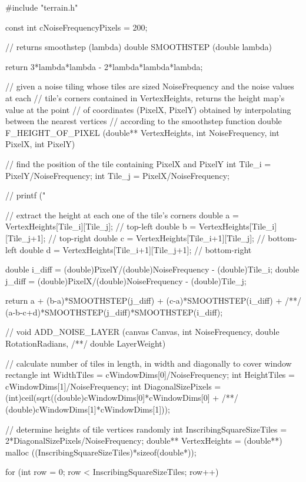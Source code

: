 \begin{C}
#include "terrain.h"


const int cNoiseFrequencyPixels = 200;


// returns smoothstep (lambda)
double SMOOTHSTEP (double lambda){
	
	return 3*lambda*lambda - 2*lambda*lambda*lambda;
}


// given a noise tiling whose tiles are sized NoiseFrequency and the noise values at each
// tile's corners contained in VertexHeights, returns the height map's value at the point
// of coordinates (PixelX, PixelY) obtained by interpolating between the nearest vertices
// according to the smoothstep function
double F_HEIGHT_OF_PIXEL (double** VertexHeights, int NoiseFrequency, int PixelX, int PixelY){
	
	// find the position of the tile containing PixelX and PixelY
	int Tile_i = PixelY/NoiseFrequency;
	int Tile_j = PixelX/NoiseFrequency;
	
	// printf ("%
	
	// extract the height at each one of the tile's corners
	double a = VertexHeights[Tile_i][Tile_j];     // top-left
	double b = VertexHeights[Tile_i][Tile_j+1];   // top-right
	double c = VertexHeights[Tile_i+1][Tile_j];   // bottom-left
	double d = VertexHeights[Tile_i+1][Tile_j+1]; // bottom-right
	
	double i_diff = (double)PixelY/(double)NoiseFrequency - (double)Tile_i;
	double j_diff = (double)PixelX/(double)NoiseFrequency - (double)Tile_j;
	
	return a + (b-a)*SMOOTHSTEP(j_diff) + (c-a)*SMOOTHSTEP(i_diff) +
	/**/ (a-b-c+d)*SMOOTHSTEP(j_diff)*SMOOTHSTEP(i_diff);
}


// 
void ADD_NOISE_LAYER (canvas Canvas, int NoiseFrequency, double RotationRadians,
/**/ double LayerWeight){
	
	// calculate number of tiles in length, in width and diagonally to cover window rectangle
	int WidthTiles = cWindowDims[0]/NoiseFrequency;
	int HeightTiles = cWindowDims[1]/NoiseFrequency;
	int DiagonalSizePixels = (int)ceil(sqrt((double)cWindowDims[0]*cWindowDims[0] +
	/**/ (double)cWindowDims[1]*cWindowDims[1]));
	
	// determine heights of tile vertices randomly
	int InscribingSquareSizeTiles = 2*DiagonalSizePixels/NoiseFrequency;
	double** VertexHeights = (double**) malloc ((InscribingSquareSizeTiles)*sizeof(double*));
	
	for (int row = 0; row < InscribingSquareSizeTiles; row++){
		
}}
\end{C}

